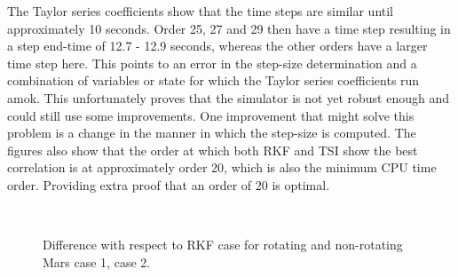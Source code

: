 The Taylor series coefficients show that the time steps are similar until approximately 10 seconds. Order 25, 27 and 29 then have a time step resulting in a step end-time of 12.7 - 12.9 seconds, whereas the other orders have a larger time step here. This points to an error in the step-size determination and a combination of variables or state for which the Taylor series coefficients run amok. This unfortunately proves that the simulator is not yet robust enough and could still use some improvements. One improvement that might solve this problem is a change in the manner in which the step-size is computed. The figures also show that the order at which both \ac{RKF} and \ac{TSI} show the best correlation is at approximately order 20, which is also the minimum CPU time order. Providing extra proof that an order of 20 is optimal.

\begin{figure}[H]
\centering
{}\\
 
 
\caption{Difference with respect to \ac{RKF} case for rotating and non-rotating Mars \protect{} case 1,  \protect{} case 2. } 
\label{fig:orderVsRKFAbsoluteDifferenceCase1combined} 
\end{figure}


